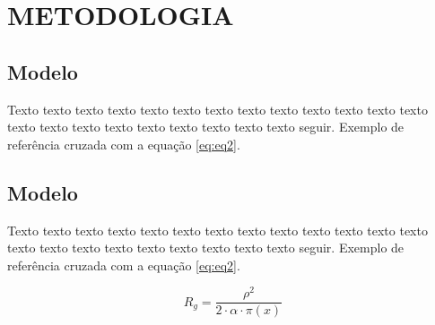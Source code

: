 

\chapter{METODOLOGIA}
\label{chap:desenvolvimento}

\section{Modelo}

Texto texto texto texto texto texto texto texto texto texto texto texto texto texto texto texto texto texto texto texto texto texto seguir. Exemplo de referência cruzada com a equação \ref{eq:eq2}.

\section{Modelo}

Texto texto texto texto texto texto texto texto texto texto texto texto texto texto texto texto texto texto texto texto texto texto seguir. Exemplo de referência cruzada com a equação \ref{eq:eq2}.

\begin{equation}
\label{eq:eq2}
R_{g} = \frac{\rho ^2}{2\cdot \alpha \cdot \pi(x)}
\end{equation}




